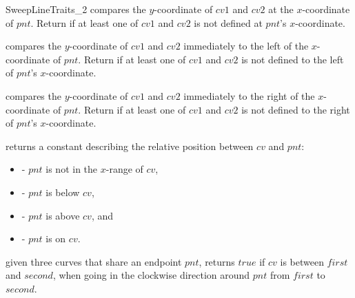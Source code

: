 \begin{ccRefConcept}{SweepLineTraits_2}
    {compares the $y$-coordinate of $cv1$ and $cv2$ at the $x$-coordinate 
     of $pnt$. Return  if at least one of $cv1$ and $cv2$  
     is not defined at $pnt$'s $x$-coordinate.}
   
  {compares the $y$-coordinate of $cv1$ and $cv2$ immediately to the
     left of the $x$-coordinate of $pnt$. Return 
     if at least one of $cv1$ and $cv2$ is not defined to the left of $pnt$'s
     $x$-coordinate.}
    
   {compares the $y$-coordinate of $cv1$ and
     $cv2$ immediately to the right of the $x$-coordinate of $pnt$.
     Return  if at least one of $cv1$ and $cv2$ is
     not defined to the right of $pnt$'s $x$-coordinate.}

    
     {returns a constant describing the
       relative position between $cv$ and $pnt$:
       \begin{itemize}
       \item[] - $pnt$ is not in the $x$-range of
       $cv$, 
       \item[] - $pnt$ is below $cv$,
       \item[] - $pnt$ is above $cv$, and
       \item[] - $pnt$ is on $cv$.
       \end{itemize}}
       
        {given three curves that share an endpoint $pnt$,
          returns $true$ if $cv$ is between $first$ and $second$, when
          going in the clockwise direction around $pnt$ from $first$
          to $second$. }




\end{ccRefConcept}

